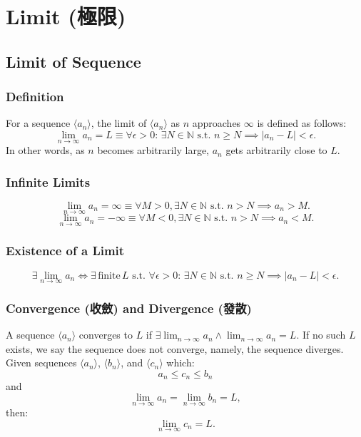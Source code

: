 \documentclass[a4paper,12pt]{report}
\begin{document}
\section{Limit (極限)}
\subsection{Limit of Sequence}
\subsubsection{Definition}
For a sequence \(\langle a_n\rangle\), the limit of \(\langle a_n\rangle\) as \( n \) approaches \( \infty \) is defined as follows:
\[\lim_{n \to \infty} a_n = L \equiv \forall \epsilon > 0:\, \exists N \in\mathbb{N}\text{\ s.t.\ } n \geq N\implies |a_n - L| < \epsilon.\]
In other words, as \(n\) becomes arbitrarily large, \(a_n\) gets arbitrarily close to \(L\).
\subsubsection{Infinite Limits}
\[\lim_{n\to \infty}a_n=\infty \equiv \forall M > 0, \exists N \in\mathbb{N} \text{\ s.t.\ } n > N \implies a_n > M.\]
\[\lim_{n\to \infty}a_n=-\infty \equiv \forall M < 0, \exists N \in\mathbb{N} \text{\ s.t.\ } n > N \implies a_n < M.\]
\subsubsection{Existence of a Limit}
\[\exists\lim_{n\to \infty}a_n\iff\exists \,\text{finite}\,L\text{\ s.t.\ } \forall \epsilon > 0:\, \exists N \in\mathbb{N}\text{\ s.t.\ } n \geq N\implies |a_n - L| < \epsilon.\]
\subsubsection{Convergence (收斂) and Divergence (發散)}
A sequence \(\langle a_n\rangle\) converges to \(L\) if \(\exists \lim_{n \to \infty} a_n \land \lim_{n \to \infty} a_n = L\). If no such \(L\) exists, we say the sequence does not converge, namely, the sequence diverges.
Given sequences $\langle a_n\rangle$, $\langle b_n\rangle$, and $\langle c_n\rangle$ which:
\[a_n\leq c_n\leq b_n\]
and
\[\lim_{n\to\infty}a_n=\lim_{n\to\infty}b_n=L,\]
then: 
\[\lim_{n\to\infty}c_n=L.\]
\end{document}
